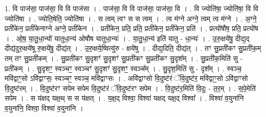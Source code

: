 \documentclass[17pt]{extarticle}
\begin{document}
1. वि पाज॑सा॒ पाज॑सा॒ वि वि पाज॑सा । . पाज॑सा॒ वि वि पाज॑सा॒ पाज॑सा॒ वि । . वि ज्योति॑षा॒ ज्योति॑षा॒ वि वि ज्योति॑षा । . ज्योति॒षेति॒ ज्योति॑षा । . स त्वम् त्वꣳ स स त्वम् । . त्व म॑ग्ने अग्ने॒ त्वम् त्व म॑ग्ने । . अ॒ग्ने॒ प्रती॑केन॒ प्रती॑केनाग्ने अग्ने॒ प्रती॑केन । . प्रती॑केन॒ प्रति॒ प्रति॒ प्रती॑केन॒ प्रती॑केन॒ प्रति॑ । . प्रत्यो॑षौष॒ प्रति॒ प्रत्यो॑ष । . ओ॒ष॒ या॒तु॒धा॒न्यो॑ यातुधा॒न्य॑ ओषौष यातुधा॒न्यः॑ । . या॒तु॒धा॒न्य॑ इति॑ यातु - धा॒न्यः॑ । . उ॒रु॒क्षये॑षु॒ दीद्य॒द् दीद्य॑दुरु॒क्षये॑षू रु॒क्षये॑षु॒ दीद्य॑त् । . उ॒रु॒क्षये॒ष्वित्यु॑रु - क्षये॑षु । . दीद्य॒दिति॒ दीद्य॑त् । . तꣳ सु॒प्रती॑कꣳ सु॒प्रती॑क॒म् तम् तꣳ सु॒प्रती॑कम् । . सु॒प्रती॑कꣳ सु॒दृशꣳ॑ सु॒दृशꣳ॑ सु॒प्रती॑कꣳ सु॒प्रती॑कꣳ सु॒दृश᳚म् । . सु॒प्रती॑क॒मिति॑ सु - प्रती॑कम् । . सु॒दृशꣳ॒॒ स्वञ्चꣳ॒॒ स्वञ्चꣳ॑ सु॒दृशꣳ॑ सु॒दृशꣳ॒॒ स्वञ्च᳚म् । . सु॒दृश॒मिति॑ सु - दृश᳚म् । . स्वञ्च॒ मवि॑द्वाꣳ॒॒सो ऽवि॑द्वाꣳसः॒ स्वञ्चꣳ॒॒ स्वञ्च॒ मवि॑द्वाꣳसः । . अवि॑द्वाꣳसो वि॒दुष्ट॑रं ॅवि॒दुष्ट॑र॒ मवि॑द्वाꣳ॒॒सो ऽवि॑द्वाꣳसो वि॒दुष्ट॑रम् । . वि॒दुष्ट॑रꣳ सपेम सपेम वि॒दुष्ट॑रं ॅवि॒दुष्ट॑रꣳ सपेम । . वि॒दुष्ट॑र॒मिति॑ वि॒दुः - त॒र॒म् । . स॒पे॒मेति॑ सपेम । . स य॑क्षद् यक्ष॒थ् स स य॑क्षत् । . य॒क्ष॒द् विश्वा॒ विश्वा॑ यक्षद् यक्ष॒द् विश्वा᳚ । . विश्वा॑ व॒युना॑नि व॒युना॑नि॒ विश्वा॒ विश्वा॑ व॒युना॑नि । \newline
\end{document}
